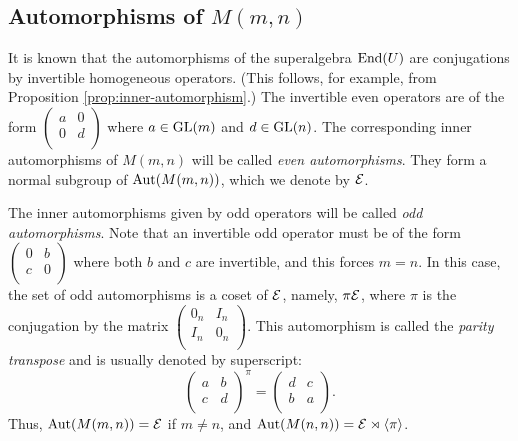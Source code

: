 \subsection{Automorphisms of $M(m,n)$}

It is known that the automorphisms of the superalgebra $\operatorname{End}(U)$ are conjugations by invertible homogeneous operators. 
(This follows, for example, from Proposition \ref{prop:inner-automorphism}.) The invertible even operators are of the form $\left( \begin{matrix}
a&0\\
0&d\\
\end{matrix}\right)$ where $a\in \operatorname{GL}(m)$ and $d\in \operatorname{GL}(n)$. The corresponding inner automorphisms of $M(m,n)$ will be called \emph{even automorphisms}. 
They form a normal subgroup of $\operatorname{Aut}(M(m,n))$, which we denote by $\mathcal E$.

The inner automorphisms given by odd operators will be called \emph{odd automorphisms}. 
Note that an invertible odd operator must be of the form $\left( \begin{matrix}
0&b\\
c&0\\
\end{matrix}\right)$ where both $b$ and $c$ are invertible, and this forces $m=n$. 
In this case, the set of odd automorphisms is a coset of $\mathcal E$, namely, $\pi \mathcal E$, 
where $\pi$ is the conjugation by the matrix $\left( \begin{matrix}
0_n & I_n\\
I_n & 0_n\\
\end{matrix}\right)$. This automorphism is called the \emph{parity transpose} and is usually denoted by superscript: 
\begin{equation*} %
\left( \begin{matrix}
a&b\\
c&d\\
\end{matrix}\right)^\pi = \left( \begin{matrix}
d&c\\
b&a\\
\end{matrix}\right).
\end{equation*} 
Thus, $\operatorname{Aut} (M(m,n)) = \mathcal E$ if $m\neq n$, and $\operatorname{Aut} (M(n,n)) = \mathcal E \rtimes \langle \pi \rangle$.

